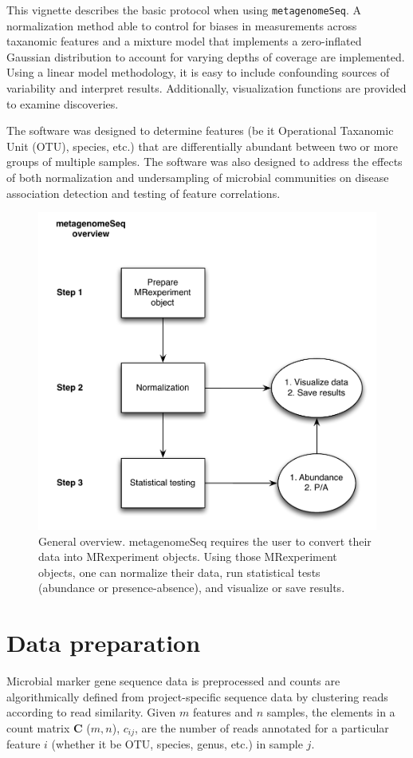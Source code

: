 \documentclass[a4paper,11pt]{article}\usepackage[]{graphicx}\usepackage[]{color}
\begin{document}
This vignette describes the basic protocol when using \texttt{metagenomeSeq}. 
A normalization method able to control for biases in measurements across taxanomic features and a mixture model that implements a zero-inflated Gaussian distribution to account for varying depths of coverage are implemented.
Using a linear model methodology, it is easy to include confounding sources of variability and interpret results. 
Additionally, visualization functions are provided to examine discoveries. 

The software was designed to determine features (be it Operational Taxanomic Unit (OTU), species, etc.) that are differentially abundant between two or more groups of multiple samples. 
The software was also designed to address the effects of both normalization and undersampling of microbial communities on disease association detection and testing of feature correlations.

\begin{figure}
\centerline{\includegraphics[width=.55\textwidth]{overview.pdf}}
\caption{General overview. metagenomeSeq requires the user to convert their data into MRexperiment objects. Using those MRexperiment objects, one can normalize their data, run statistical tests (abundance or presence-absence), and visualize or save results.}
\end{figure}

\newpage
\section{Data preparation}
Microbial marker gene sequence data is preprocessed and counts are algorithmically defined 
from project-specific sequence data by clustering reads according to read similarity. 
Given $m$ features and $n$ samples, the elements in a count matrix 
\textbf{C} ($m, n$), $c_{ij}$, are the number of reads annotated for a particular 
feature $i$ (whether it be OTU, species, genus, etc.) in sample $j$. \\
\end{document}
